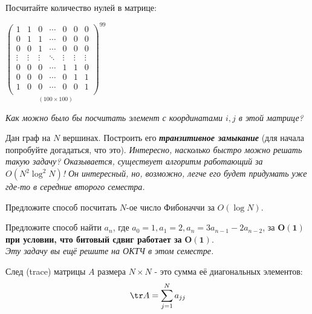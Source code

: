 	\begin{problem}{
		Посчитайте количество нулей в матрице: \\
			\centerline{
				$\underset{(100 \times 100)}{\begin{pmatrix}
					1 & 1 & 0 & \cdots & 0 & 0 & 0 \\
					0 & 1 & 1 & \cdots & 0 & 0 & 0 \\
					0 & 0 & 1 & \cdots & 0 & 0 & 0 \\
					\vdots & \vdots & \vdots  & \ddots & \vdots & \vdots & \vdots \\
					0 & 0 & 0 & \cdots & 1 & 1 & 0 \\
					0 & 0 & 0 & \cdots & 0 & 1 & 1 \\
					1 & 0 & 0 & \cdots & 0 & 0 & 1  \\
				\end{pmatrix}^{99}}$
			}
		\textit{Как можно было бы посчитать элемент с координатами $i, j$ в этой матрице?}
		
	}\end{problem}

	\begin{problem}
		Дан граф на $N$ вершинах. Построить его \textit{\textbf{транзитивное замыкание}} (для начала попробуйте догадаться, что это).
		\textit{Интересно, насколько быстро можно решать такую задачу? Оказывается, существует алгоритм работающий за $O(N^2 \log^2 N)$! Он интересный, но, возможно, легче его будет придумать уже где-то в середние второго семестра.} 
	\end{problem}


	\begin{problem}
		Предложите способ посчитать $N$-ое число Фибоначчи за $O(\log N)$. 	
	\end{problem}
	
	\begin{problem}
		Предложите способ найти $a_n$, где $a_0 = 1, a_1 = 2, a_n = 3a_{n-1} - 2a_{n-2}$, за $\mathbf{O(1)}$ \textbf{при условии, что битовый сдвиг работает за} $\mathbf{O(1)}$.
		\\
		\textit{Эту задачу вы ещё решите на ОКТЧ в этом семестре.}
	\end{problem}

	
	\begin{definition}
		След (trace) матрицы $A$ размера $N \times N$ - это сумма её диагональных элементов: 
		$$ \tr A = \sum_{j=1}^{N} a_{jj}$$
	\end{definition}

